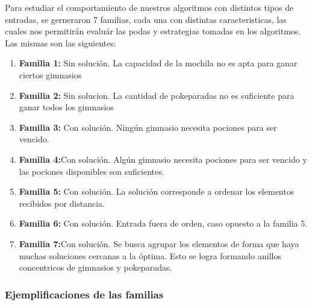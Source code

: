 \indent Para estudiar el comportamiento de nuestros algoritmos con distintos tipos de entradas, se gerneraron 7 familias, cada una con distintas caracteristicas, las cuales nos permitirán evaluár las  podas y estrategias tomadas en los algoritmos. Las mismas son las siguientes:

\begin{enumerate}
\item {\bf Familia 1:}  Sin solución. La capacidad de la mochila no es apta para ganar ciertos gimnasios
\item {\bf Familia 2:} Sin solucion. La cantidad de pokeparadas no es suficiente para ganar todos los gimnasios
\item {\bf Familia 3:} Con solución. Ning\'un gimnasio necesita pociones para ser vencido.
\item {\bf Familia 4:}Con solución. Algún gimnasio necesita pociones para ser vencido y las pociones disponibles son suficientes.
\item {\bf Familia 5:} Con solución. La solución corresponde a ordenar los elementos recibidos por distancia.
\item {\bf Familia 6:} Con solución. Entrada fuera de orden, caso opuesto a la familia 5.
\item {\bf Familia 7:}Con solución. Se busca agrupar los elementos de forma que haya muchas soluciones cercanas a la óptima. Esto se logra formando anillos concentricos de gimnasios y pokeparadas.
\end{enumerate}


 \subsubsection*{Ejemplificaciones de las familias}
 
